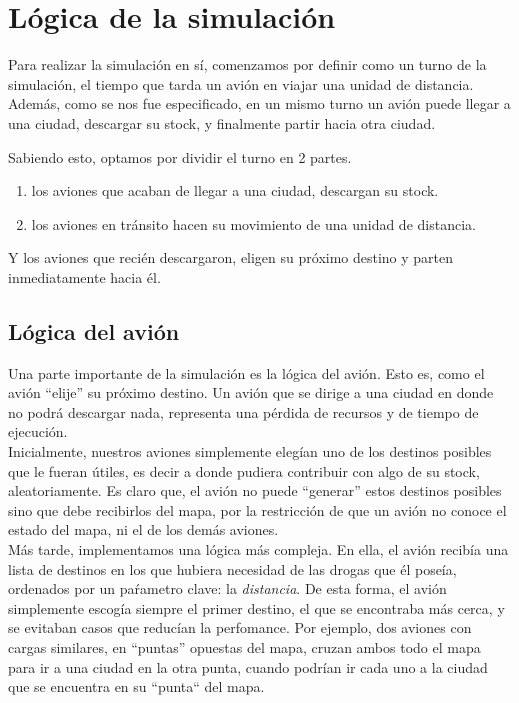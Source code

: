 \documentclass[a4paper,10pt]{article}
\begin{document}
\newpage
\section{Lógica de la simulación}
Para realizar la simulación en sí, comenzamos por definir como un turno de la simulación, el tiempo que tarda un avión en viajar una unidad de distancia.
Además, como se nos fue especificado, en un mismo turno un avión puede llegar a una ciudad, descargar su stock, y finalmente partir hacia otra ciudad.

Sabiendo esto, optamos por dividir el turno en 2 partes.
\begin{enumerate}
  \item los aviones que acaban de llegar a una ciudad, descargan su stock.
  \item los aviones en tránsito hacen su movimiento de una unidad de distancia.
\end{enumerate}

Y los aviones que recién descargaron, eligen su próximo destino y parten inmediatamente hacia él.

\subsection{Lógica del avión}

Una parte importante de la simulación es la lógica del avión. Esto es, como el avión ``elije'' su próximo destino. Un avión que se dirige a una ciudad en donde no 
podrá descargar nada, representa una pérdida de recursos y de tiempo de ejecución.\\

Inicialmente, nuestros aviones simplemente elegían uno de los destinos posibles que le fueran útiles, es decir a donde pudiera contribuir con algo de su stock, 
aleatoriamente. Es claro que, el avión no puede ``generar'' estos destinos posibles sino que debe recibirlos del mapa, por la restricción de que un avión no 
conoce el estado del mapa, ni el de los demás aviones.\\

Más tarde, implementamos una lógica más compleja. En ella, el avión recibía una lista de destinos en los que hubiera necesidad de las drogas que él poseía, 
ordenados por un paŕametro clave: la \textit{distancia}. De esta forma, el avión simplemente escogía siempre el primer destino, el que se encontraba más cerca, y 
se evitaban casos que reducían la perfomance. Por ejemplo, dos aviones con cargas similares, en ``puntas'' opuestas del mapa, cruzan ambos todo el mapa para ir a una 
ciudad en la otra punta, cuando podrían ir cada uno a la ciudad que se encuentra en su ``punta`` del mapa.\\
\end{document}
